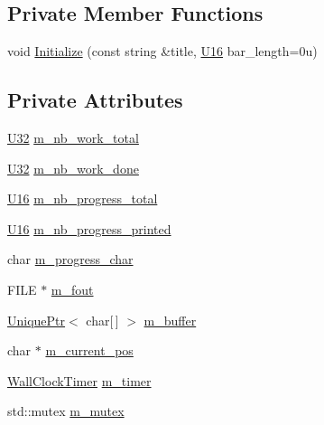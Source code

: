 \subsection*{Private Member Functions}
\begin{DoxyCompactItemize}
\item 
void \mbox{\hyperlink{classmage_1_1_progress_reporter_1_1_impl_aca61c9f4dc622784124e7812daa1f273}{Initialize}} (const string \&title, \mbox{\hyperlink{namespacemage_af69057eec1ce005c1c3b34ae33486f16}{U16}} bar\+\_\+length=0u)
\end{DoxyCompactItemize}
\subsection*{Private Attributes}
\begin{DoxyCompactItemize}
\item 
\mbox{\hyperlink{namespacemage_a41c104c036fba3756a74e19f793eeaa1}{U32}} \mbox{\hyperlink{classmage_1_1_progress_reporter_1_1_impl_a58c67973a05cb65276612f56ff4409a6}{m\+\_\+nb\+\_\+work\+\_\+total}}
\item 
\mbox{\hyperlink{namespacemage_a41c104c036fba3756a74e19f793eeaa1}{U32}} \mbox{\hyperlink{classmage_1_1_progress_reporter_1_1_impl_ad35ff8031b2826f41912abc44dbd1d24}{m\+\_\+nb\+\_\+work\+\_\+done}}
\item 
\mbox{\hyperlink{namespacemage_af69057eec1ce005c1c3b34ae33486f16}{U16}} \mbox{\hyperlink{classmage_1_1_progress_reporter_1_1_impl_a286a47e68cdbae261b94dd238e1c9328}{m\+\_\+nb\+\_\+progress\+\_\+total}}
\item 
\mbox{\hyperlink{namespacemage_af69057eec1ce005c1c3b34ae33486f16}{U16}} \mbox{\hyperlink{classmage_1_1_progress_reporter_1_1_impl_a06efb1bb26ffbba0cd26db5df79021f8}{m\+\_\+nb\+\_\+progress\+\_\+printed}}
\item 
char \mbox{\hyperlink{classmage_1_1_progress_reporter_1_1_impl_a6796267101fa30e107ed0d5031a8dca3}{m\+\_\+progress\+\_\+char}}
\item 
F\+I\+LE $\ast$ \mbox{\hyperlink{classmage_1_1_progress_reporter_1_1_impl_a1ef149837131c4c615a4be082605f62c}{m\+\_\+fout}}
\item 
\mbox{\hyperlink{namespacemage_a3316d7143a973e37adf1110f2e80ca31}{Unique\+Ptr}}$<$ char\mbox{[}$\,$\mbox{]} $>$ \mbox{\hyperlink{classmage_1_1_progress_reporter_1_1_impl_a0ae90634d05295f7c1a8294e343418e2}{m\+\_\+buffer}}
\item 
char $\ast$ \mbox{\hyperlink{classmage_1_1_progress_reporter_1_1_impl_ab1513044548160ad7a6d181ae2618f1b}{m\+\_\+current\+\_\+pos}}
\item 
\mbox{\hyperlink{namespacemage_a06f4035ef59f07892e594bf1178a108a}{Wall\+Clock\+Timer}} \mbox{\hyperlink{classmage_1_1_progress_reporter_1_1_impl_a8eea94dc2c87abc34d80ad61b5adea2e}{m\+\_\+timer}}
\item 
std\+::mutex \mbox{\hyperlink{classmage_1_1_progress_reporter_1_1_impl_acc8b21e5c74a202b1fb8f80a26132bfc}{m\+\_\+mutex}}
\end{DoxyCompactItemize}


